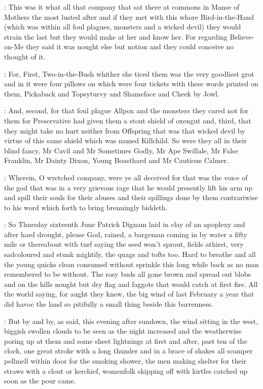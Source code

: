 \documentclass[12pt]{article}
\begin{document}

: This was it what all that company that sat there at commons in Manse of
Mothers the most lusted after and if they met with this whore Bird-in-the-Hand
(which was within all foul plagues, monsters and a wicked devil)
they would strain the last but they would make at her and know her. For
regarding Believe-on-Me they said it was nought else but notion and they
could conceive no thought of it.

: For, First, Two-in-the-Bush whither she ticed them was the very
goodliest grot and in it were four pillows on which were four tickets with
these words printed on them, Pickaback and Topsyturvy and Shameface and
Cheek by Jowl.

: And, second, for that foul plague Allpox and the monsters they cared
not for them for Preservative had given them a stout shield of oxengut
and, third, that they might take no hurt neither from Offspring that was
that wicked devil by virtue of this same shield which was named Killchild.
So were they all in their blind fancy, Mr Cavil and Mr Sometimes Godly, Mr
Ape Swillale, Mr False Franklin, Mr Dainty Dixon, Young Boasthard and Mr
Cautious Calmer.

: Wherein, O wretched company, were ye all deceived for that was the voice
of the god that was in a very grievous rage that he would presently lift
his arm up and spill their souls for their abuses and their spillings
done by them contrariwise to his word which forth to bring brenningly
biddeth.



: So Thursday sixteenth June Patrick Dignam laid in clay of an apoplexy
and after hard drought, please God, rained, a bargeman coming in by water
a fifty mile or thereabout with turf saying the seed won't sprout, fields
athirst, very sadcoloured and stunk mightily, the quags and tofts too.
Hard to breathe and all the young quicks clean consumed without sprinkle
this long while back as no man remembered to be without. The rosy buds
all gone brown and spread out blobs and on the hills nought but dry flag
and faggots that would catch at first fire. All the world saying, for
aught they knew, the big wind of last February a year that did havoc the
land so pitifully a small thing beside this barrenness.

: But by and by, as said, this evening after sundown, the wind sitting
in the west, biggish swollen clouds to be seen as the night increased and
the weatherwise poring up at them and some sheet lightnings at first and
after, past ten of the clock, one great stroke with a long thunder and in
a brace of shakes all scamper pellmell within door for the smoking shower,
the men making shelter for their straws with a clout or kerchief,
womenfolk skipping off with kirtles catched up soon as the pour came.
\end{document}
